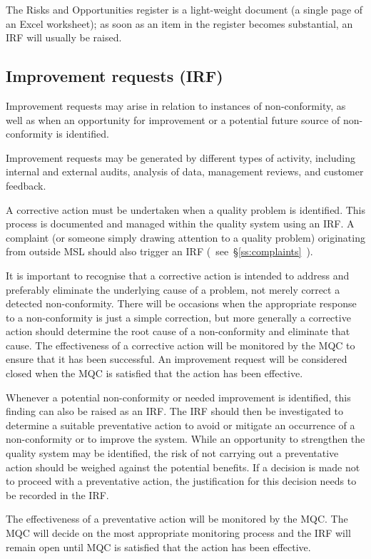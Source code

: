 The Risks and Opportunities register is a light-weight document (a single page of an Excel worksheet); as soon as an item in the register becomes substantial, an IRF will usually be raised. 

\subsection{Improvement requests (IRF)}
\label{ss:improvement_requests}
Improvement requests may arise in relation to instances of non-conformity, as well as when an opportunity for improvement or a potential future source of non-conformity is identified. 

Improvement requests may be generated by different types of activity, including internal and external audits, analysis of data, management reviews, and customer feedback. 

A corrective action must be undertaken when a quality problem is identified. This process is documented and managed within the quality system using an IRF. A complaint (or someone simply drawing attention to a quality problem) originating from outside MSL should also trigger an IRF (~see~\S\ref{ss:complaints}~).

It is important to recognise that a corrective action is intended to address and preferably eliminate the underlying cause of a problem, not merely correct a detected non-conformity. There will be occasions when the appropriate response to a non-conformity is just a simple correction, but more generally a corrective action should determine the root cause of a non-conformity and eliminate that cause. The effectiveness of a corrective action will be monitored by the MQC to ensure that it has been successful.  An improvement request will be considered closed when the MQC is satisfied that the action has been effective.

Whenever a potential non-conformity or needed improvement is identified, this finding can also be raised as an IRF. The IRF should then be investigated to determine a suitable preventative action to avoid or mitigate an occurrence of a non-conformity or to improve the system. While an opportunity to strengthen the quality system may be identified, the risk of not carrying out a preventative action should be weighed against the potential benefits. If a decision is made not to proceed with a preventative action, the justification for this decision needs to be recorded in the IRF.

The effectiveness of a preventative action will be monitored by the MQC. The MQC will decide on the most appropriate monitoring process and the IRF will remain open until MQC is satisfied that the action has been effective. 

